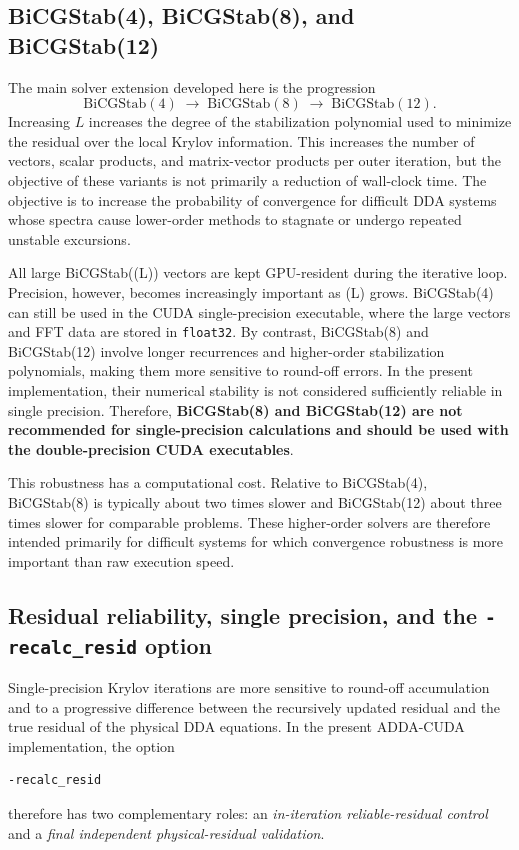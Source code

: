 \documentclass[11pt,a4paper]{article}
\begin{document}
\subsection{BiCGStab(4), BiCGStab(8), and BiCGStab(12)}

The main solver extension developed here is the progression
\begin{equation}
\mathrm{BiCGStab}(4)\;\longrightarrow\;\mathrm{BiCGStab}(8)\;\longrightarrow\;\mathrm{BiCGStab}(12).
\end{equation}
Increasing \(L\) increases the degree of the stabilization polynomial used to minimize the residual over the local Krylov information. This increases the number of vectors, scalar products, and matrix-vector products per outer iteration, but the objective of these variants is not primarily a reduction of wall-clock time. The objective is to increase the probability of convergence for difficult DDA systems whose spectra cause lower-order methods to stagnate or undergo repeated unstable excursions.

All large BiCGStab((L)) vectors are kept GPU-resident during the iterative loop. Precision, however, becomes increasingly important as (L) grows. BiCGStab(4) can still be used in the CUDA single-precision executable, where the large vectors and FFT data are stored in \texttt{float32}. By contrast, BiCGStab(8) and BiCGStab(12) involve longer recurrences and higher-order stabilization polynomials, making them more sensitive to round-off errors. In the present implementation, their numerical stability is not considered sufficiently reliable in single precision. Therefore, \textbf{BiCGStab(8) and BiCGStab(12) are not recommended for single-precision calculations and should be used with the double-precision CUDA executables}.

This robustness has a computational cost. Relative to BiCGStab(4), BiCGStab(8) is typically about two times slower and BiCGStab(12) about three times slower for comparable problems. These higher-order solvers are therefore intended primarily for difficult systems for which convergence robustness is more important than raw execution speed.

\subsection{Residual reliability, single precision, and the \texttt{-recalc\_resid} option}

Single-precision Krylov iterations are more sensitive to round-off accumulation and to a progressive difference between the recursively updated residual and the true residual of the physical DDA equations. In the present ADDA-CUDA implementation, the option
\begin{verbatim}
-recalc_resid
\end{verbatim}
therefore has two complementary roles: an \emph{in-iteration reliable-residual control} and a \emph{final independent physical-residual validation}.
\end{document}
